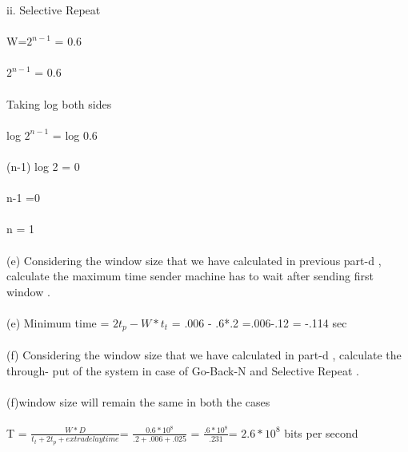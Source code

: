 \documentclass[a4paper,12pt]{article}
\begin{document}
   ii. Selective Repeat \\\\
   W=$2^{n-1}$ = 0.6\\\\
   $2^{n-1}$ = 0.6 \\\\
   Taking log both sides \\\\
   log $2^{n-1}$ = log 0.6\\\\
   (n-1) log 2 = 0\\\\
   n-1 =0\\\\
   n = 1 \\\\
(e) Considering the window size that we have calculated in previous part-d , calculate
the maximum time sender machine has to wait after sending first window .\\\\
(e) Minimum time = $2t_{p}- W*t_{t}$ = .006 - .6*.2 =.006-.12 = -.114 sec \\\\
(f) Considering the window size that we have calculated in part-d , calculate the through-
put of the system in case of Go-Back-N and Selective Repeat .\\\\
(f)window size will remain the same in both the cases\\\\
    T = $\frac{W*D}{t_{t}+2t_{p}+ extra delay time}$= $\frac{0.6* 10^8 }{.2 +.006 + .025}$ = $\frac{.6 * 10^8}{.231}$= $2.6*10^8$ bits per second\\\\
\end{document}
